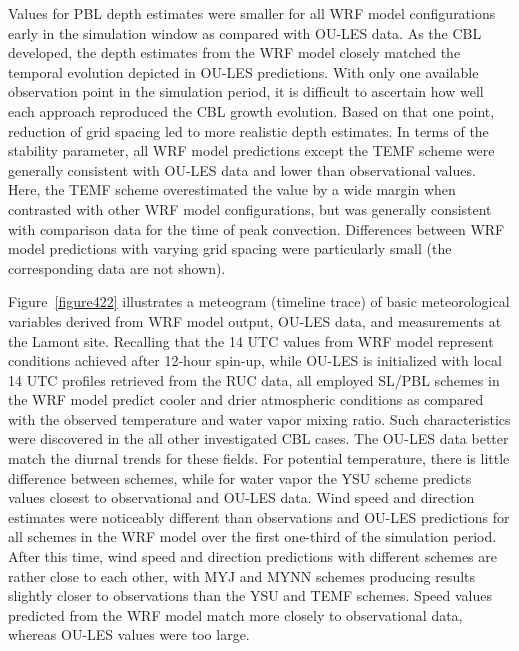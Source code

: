 Values for PBL depth estimates were smaller for all WRF model configurations early in the simulation window as compared with OU-LES data. As the CBL developed, the depth estimates from the WRF model closely matched the temporal evolution depicted in OU-LES predictions. With only one available observation point in the simulation period, it is difficult to ascertain how well each approach reproduced the CBL growth evolution. Based on that one point, reduction of grid spacing led to more realistic depth estimates. In terms of the stability parameter, all WRF model predictions except the TEMF scheme were generally consistent with OU-LES data and lower than observational values. Here, the TEMF scheme overestimated the value by a wide margin when contrasted with other WRF model configurations, but was generally consistent with comparison data for the time of peak convection. Differences between WRF model predictions with varying grid spacing were particularly small (the corresponding data are not shown). 

Figure~\ref{figure422} illustrates a meteogram (timeline trace) of basic meteorological variables derived from WRF model output, OU-LES data, and measurements at the Lamont site. Recalling that the 14 UTC values from WRF model represent conditions achieved after 12-hour spin-up, while OU-LES is initialized with local 14 UTC profiles retrieved from the RUC data, all employed SL\slash PBL schemes in the WRF model predict cooler and drier atmospheric conditions as compared with the observed temperature and water vapor mixing ratio. Such characteristics were discovered in the all other investigated CBL cases. The OU-LES data better match the diurnal trends for these fields. For potential temperature, there is little difference between schemes, while for water vapor the YSU scheme predicts values closest to observational and OU-LES data. Wind speed and direction estimates were noticeably different than observations and OU-LES predictions for all schemes in the WRF model over the first one-third of the simulation period. After this time, wind speed and direction predictions with different schemes are rather close to each other, with MYJ and MYNN schemes producing results slightly closer to observations than the YSU and TEMF schemes. Speed values predicted from the WRF model match more closely to observational data, whereas OU-LES values were too large.


